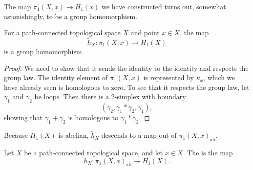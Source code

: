 \documentclass[main.tex]{subfiles}
\begin{document}
The map \(\pi_{1}(X, x) \to H_{1}(x)\) we have constructed turns out, somewhat astonishingly, to be a group homomorphism.
\begin{lemma}
  \label{lemma:hurewicz_is_homomorphism}
  For a path-connected topological space $X$ and point $x \in X$, the map
  \begin{equation*}
    \tilde{h}_{X}\colon \pi_{1}(X, x) \to H_{1}(X)
  \end{equation*}
  is a group homomorphism.
\end{lemma}
\begin{proof}
  We need to show that it sends the identity to the identity and respects the group law. The identity element of \(\pi_{1}(X, x)\) is represented by \(\kappa_{x}\), which we have already seen is homologous to zero. To see that it respects the group law, let \(\gamma_{1}\) and \(\gamma_{2}\) be loops. Then there is a 2-simplex with boundary
  \begin{equation*}
    (\gamma_{2}, \gamma_{1} * \gamma_{2}, \gamma_{1}),
  \end{equation*}
  showing that \(\gamma_{1} + \gamma_{2}\) is homologous to \(\gamma_{1}*\gamma_{2}\).
\end{proof}

Because $H_{1}(X)$ is abelian, $\tilde{h}_{X}$ descends to a map out of $\pi_{1}(X, x)_{\mathrm{ab}}$.

\begin{definition}
  \label{def:hurewicz_homomorphism}
  Let $X$ be a path-connected topological space, and let $x \in X$. The  is the map
  \begin{equation*}
    h_{X}\colon \pi_{1}(X, x)_{\mathrm{ab}} \to H_{1}(X).
  \end{equation*}
\end{definition}
\end{document}
